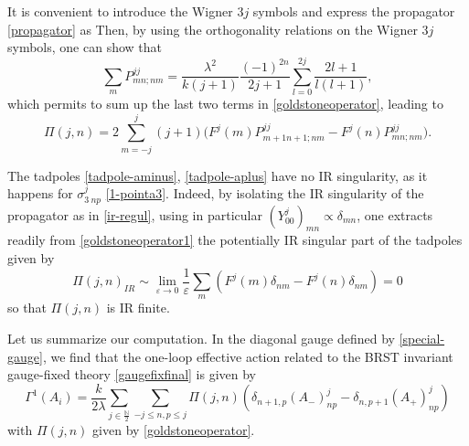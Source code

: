 \documentclass[11pt]{book}
\theoremstyle{break}
\begin{document}
It is convenient to introduce the Wigner $3j$ symbols
and express the propagator \eqref{propagator} as
Then, by using the orthogonality relations on the Wigner $3j$ symbols, one can show that
\begin{equation}
\sum_{m}P^{jj}_{mn;nm}=\frac{\lambda^2}{k(j+1)}\frac{(-1)^{2n}}{2j+1}\sum_{l=0}^{2j}\frac{2l+1}{l(l+1)}\label{sum-boundary},
\end{equation}
which permits to sum up the last two terms in \eqref{goldstoneoperator}, leading to
\begin{equation}
\Pi(j,n)=2\sum_{m=-j}^j(j+1)\big(F^j(m)P^{jj}_{m+1n+1;nm}-F^j(n)P^{jj}_{mn;nm}\big)\label{goldstoneoperator1}.
\end{equation}

The tadpoles \eqref{tadpole-aminus}, \eqref{tadpole-aplus} have no IR singularity, as it happens for $\sigma^{j}_{3\ np}$ \eqref{1-pointa3}. Indeed, by isolating the IR singularity of the propagator as in \eqref{ir-regul}, using in particular $(Y^j_{00})_{mn}\varpropto\delta_{mn}$, one extracts readily from \eqref{goldstoneoperator1} the potentially IR singular part of the tadpoles given by
\begin{equation}
\Pi(j,n)_{IR}\sim\lim_{\varepsilon\to0}\frac{1}{\varepsilon}\sum_m(F^j(m)\delta_{nm}-F^j(n)\delta_{nm})=0
\end{equation}
so that $\Pi(j,n)$ is IR finite.\par 

Let us summarize our computation. In the diagonal gauge defined by \eqref{special-gauge}, we find that the one-loop effective action related to the BRST invariant gauge-fixed theory \eqref{gaugefixfinal} is given by
\begin{equation}
\Gamma^1(A_i)=\frac{k}{2\lambda}\sum_{j\in\frac{\mathbb{N}}{2}}\sum_{-j\le n,p\le j}\Pi(j,n)(\delta_{n+1,p}(A_-)^j_{np}-\delta_{n,p+1}(A_+)^j_{np})\label{effective-lin}
\end{equation}
with $\Pi(j,n)$ given by \eqref{goldstoneoperator}.
\end{document}
